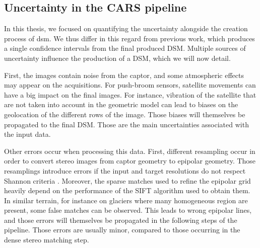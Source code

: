 \subsection{Uncertainty in the CARS pipeline}\label{sec:uncertainty_cars}
In this thesis, we focused on quantifying the uncertainty alongside the creation process of \acrshort{dsm}. We thus differ in this regard from previous work, which produces a single confidence intervals from the final produced DSM. Multiple sources of uncertainty influence the production of a DSM, which we will now detail.

First, the images contain noise from the captor, and some atmospheric effects may appear on the acquisitions. For push-broom sensors, satellite movements can have a big impact on the final images. For instance, vibration of the satellite that are not taken into account in the geometric model can lead to biases on the geolocation of the different rows of the image. Those biases will themselves be propagated to the final DSM. Those are the main uncertainties associated with the input data.

Other errors occur when processing this data. First, different resampling occur in order to convert stereo images from captor geometry to epipolar geometry. Those resamplings introduce errors if the input and target resolutions do not respect Shannon criteria \cite{delon_small_2007} . Moreover, the sparse matches used to refine the epipolar grid heavily depend on the performance of the SIFT algorithm used to obtain them. In similar terrain, for instance on glaciers where many homogeneous region are present, some false matches can be observed. This leads to wrong epipolar lines, and those errors will themselves be propagated in the following steps of the pipeline. Those errors are usually minor, compared to those occurring in the dense stereo matching step.

